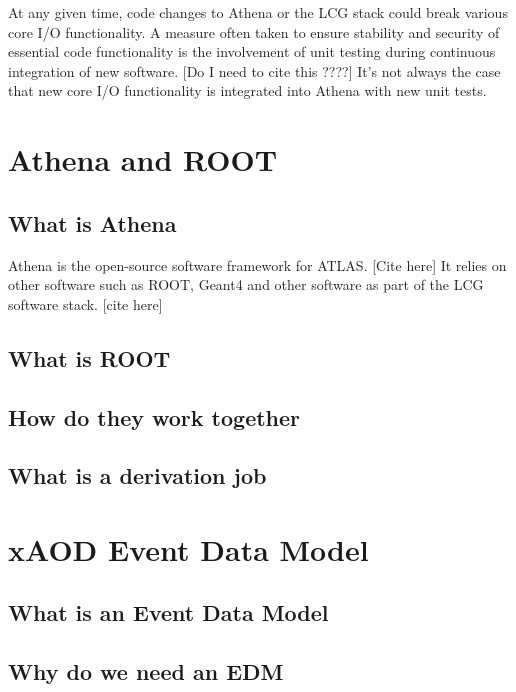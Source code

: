 At any given time, code changes to Athena or the LCG stack could break various core I/O functionality. 
A measure often taken to ensure stability and security of essential code functionality is the involvement of unit testing during continuous integration of new software. [Do I need to cite this ????] 
It's not always the case that new core I/O functionality is integrated into Athena with new unit tests. 

\section{Athena and ROOT}
\subsection{What is Athena}
Athena is the open-source software framework for ATLAS. [Cite here]
It relies on other software such as ROOT, Geant4 and other software as part of the LCG software stack. [cite here]

\subsection{What is ROOT}
\subsection{How do they work together}
\subsection{What is a derivation job}

\section{xAOD Event Data Model}
\subsection{What is an Event Data Model}
\subsection{Why do we need an EDM}

